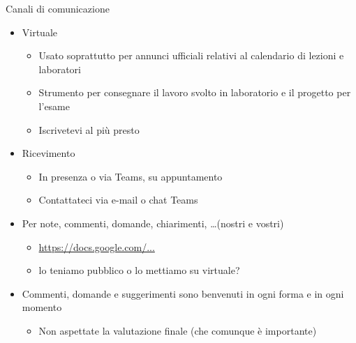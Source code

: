 \begin{frame}{Canali di comunicazione}

  \begin{itemize}[<+->]
  \item Virtuale

    \begin{itemize}[<.->]
    \item Usato soprattutto per annunci ufficiali relativi al calendario di
      lezioni e laboratori
    \item Strumento per consegnare il lavoro svolto in laboratorio e il progetto
      per l'esame
    \item Iscrivetevi al più presto
    \end{itemize}

  \item Ricevimento

    \begin{itemize}[<.->]
    \item In presenza o via Teams, su appuntamento
    \item Contattateci via e-mail o chat Teams
    \end{itemize}

  \item Per note, commenti, domande, chiarimenti, \ldots (nostri e vostri)
    \begin{itemize}[<.->]
    \item \url{https://docs.google.com/...}
    \item lo teniamo pubblico o lo mettiamo su virtuale?
    \end{itemize}

  \item Commenti, domande e suggerimenti sono benvenuti in ogni forma e in ogni
    momento
    \begin{itemize}[<.->]
    \item Non aspettate la valutazione finale (che comunque è importante)
    \end{itemize}

  \end{itemize}

\end{frame}

